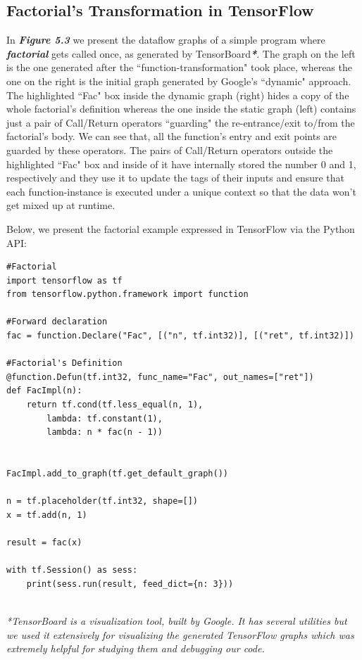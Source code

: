 \documentclass[ack,preface]{dithesis}
\begin{document}
    \subsection{Factorial's Transformation  in TensorFlow}
In  \textit{\textbf{Figure 5.3}} we present the dataflow graphs of a simple program where \textit{\textbf{factorial}} gets called once, as generated by TensorBoard\textit{\textbf{*}}. 
The graph on the left is the one generated after the ``function-transformation" took place, whereas the one on the right is the initial graph generated by Google's ``dynamic" approach.
The highlighted ``Fac" box inside the dynamic graph (right) hides a copy of the whole factorial's definition whereas the one inside the static graph (left) contains just a pair of Call/Return operators ``guarding" the re-entrance/exit to/from the  factorial's body. We can see that, all the function's entry and exit points are guarded by these operators. The pairs of Call/Return operators outside the highlighted ``Fac" box and inside of it  have internally stored the number 0 and 1, respectively and they use it to update the tags of their inputs and ensure that each function-instance is executed under a unique context so that the data won't get mixed up at runtime.

Below, we present the factorial example expressed in TensorFlow  via the Python API:

\begin{lstlisting}
#Factorial
import tensorflow as tf
from tensorflow.python.framework import function

#Forward declaration
fac = function.Declare("Fac", [("n", tf.int32)], [("ret", tf.int32)])

#Factorial's Definition
@function.Defun(tf.int32, func_name="Fac", out_names=["ret"])
def FacImpl(n):
	return tf.cond(tf.less_equal(n, 1),
		lambda: tf.constant(1),
		lambda: n * fac(n - 1))


FacImpl.add_to_graph(tf.get_default_graph())

n = tf.placeholder(tf.int32, shape=[])
x = tf.add(n, 1)

result = fac(x)

with tf.Session() as sess:
	print(sess.run(result, feed_dict={n: 3}))

\end{lstlisting}

\ \\

\textit{*TensorBoard is a visualization tool, built by Google. It has several utilities but we used it extensively for visualizing the generated TensorFlow graphs which was extremely helpful for studying them and debugging our code.}
\end{document}
